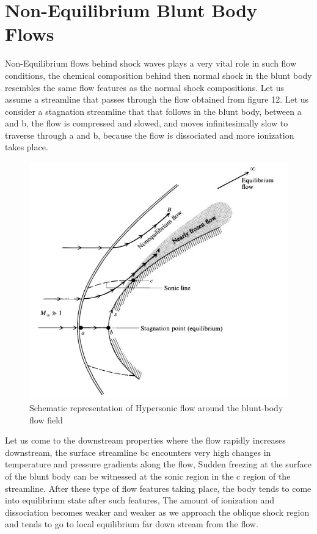 \section{Non-Equilibrium Blunt Body Flows}
Non-Equilibrium flows behind shock waves plays a very vital role in such flow conditions, the chemical composition behind then normal shock in the blunt body resembles the same flow features as the normal shock compositions. Let us assume a streamline that passes through the flow obtained from figure 12.
Let us consider a stagnation streamline that that follows in the blunt body, between a and b, the flow is compressed and slowed, and moves infinitesimally slow to traverse through a and b, because the flow is dissociated and more ionization takes place.

\begin{figure}[ht]
\centering
  \includegraphics[width=0.7\linewidth]{images/bluntbody_streamline.jpg}
  \caption{Schematic representation of Hypersonic flow around the blunt-body flow field}
  \label{fig:boat1}
\end{figure}

Let us come to the downstream properties where the flow rapidly increases downstream, the surface streamline bc encounters very high changes in temperature and pressure gradients along the flow, Sudden freezing at the surface of the blunt body can be witnessed at the sonic region in the c region of the streamline. After these type of flow features taking place, the body tends to come into equilibrium state after such features, The amount of ionization and dissociation becomes weaker and weaker as we approach the oblique shock region and tends to go to local equilibrium far down stream from the flow.


